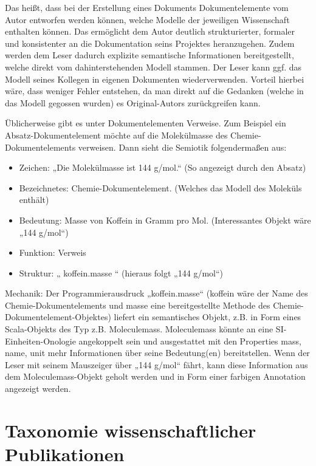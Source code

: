  
Das heißt, dass bei der Erstellung eines Dokuments Dokumentelemente vom Autor entworfen werden können, welche Modelle der jeweiligen Wissenschaft enthalten können. Das ermöglicht dem Autor deutlich strukturierter, formaler und konsistenter an die Dokumentation seins Projektes heranzugehen. Zudem werden dem Leser dadurch explizite semantische Informationen bereitgestellt, welche direkt vom dahinterstehenden Modell stammen. Der Leser kann ggf. das Modell seines Kollegen in eigenen Dokumenten wiederverwenden. Vorteil hierbei wäre, dass weniger Fehler entstehen, da man direkt auf die Gedanken (welche in das Modell gegossen wurden) es Original-Autors zurückgreifen kann.

 
Üblicherweise gibt es unter Dokumentelementen Verweise. Zum Beispiel ein Absatz-Dokumentelement möchte auf die Molekülmasse des Chemie-Dokumentelements verweisen. Dann sieht die Semiotik folgendermaßen aus:

 
\begin{itemize}

\item Zeichen: „Die Molekülmasse ist 144 g/mol.“ (So angezeigt durch den Absatz)
\item Bezeichnetes: Chemie-Dokumentelement. (Welches das Modell des Moleküls enthält)
\item Bedeutung: Masse von Koffein in Gramm pro Mol. (Interessantes Objekt wäre „144 g/mol“)
\item Funktion: Verweis
\item Struktur: „{ koffein.masse }“ (hieraus folgt „144 g/mol“)
\end{itemize}
 
Mechanik: Der Programmierausdruck „koffein.masse“ (koffein wäre der Name des Chemie-Dokumentelements und masse eine bereitgestellte Methode des Chemie-Dokumentelement-Objektes) liefert ein semantisches Objekt, z.B. in Form eines Scala-Objekts des Typ z.B. Moleculemass. Moleculemass könnte an eine SI-Einheiten-Onologie angekoppelt sein und ausgestattet mit den Properties mass, name, unit mehr Informationen über seine Bedeutung(en) bereitstellen. Wenn der Leser mit seinem Mauszeiger über „144 g/mol“ fährt, kann diese Information aus dem Moleculemass-Objekt geholt werden und in Form einer farbigen Annotation angezeigt werden.

 
\section{Taxonomie wissenschaftlicher Publikationen}\label{}
 
